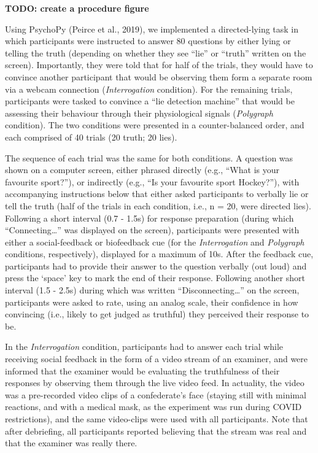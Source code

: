 \documentclass[
  man,floatsintext]{apa6}
\begin{document}
\textbf{TODO: create a procedure figure}

Using PsychoPy (Peirce et al., 2019), we implemented a directed-lying task in which participants were instructed to answer 80 questions by either lying or telling the truth (depending on whether they see ``lie'' or ``truth'' written on the screen). Importantly, they were told that for half of the trials, they would have to convince another participant that would be observing them form a separate room via a webcam connection (\emph{Interrogation} condition). For the remaining trials, participants were tasked to convince a ``lie detection machine'' that would be assessing their behaviour through their physiological signals (\emph{Polygraph} condition). The two conditions were presented in a counter-balanced order, and each comprised of 40 trials (20 truth; 20 lies).

The sequence of each trial was the same for both conditions. A question was shown on a computer screen, either phrased directly (e.g., ``What is your favourite sport?''), or indirectly (e.g., ``Is your favourite sport Hockey?''), with accompanying instructions below that either asked participants to verbally lie or tell the truth (half of the trials in each condition, i.e., n = 20, were directed lies). Following a short interval (0.7 - 1.5s) for response preparation (during which ``Connecting\ldots{}'' was displayed on the screen), participants were presented with either a social-feedback or biofeedback cue (for the \emph{Interrogation} and \emph{Polygraph} conditions, respectively), displayed for a maximum of 10s. After the feedback cue, participants had to provide their answer to the question verbally (out loud) and press the `space' key to mark the end of their response. Following another short interval (1.5 - 2.5s) during which was written ``Disconnecting\ldots{}'' on the screen, participants were asked to rate, using an analog scale, their confidence in how convincing (i.e., likely to get judged as truthful) they perceived their response to be.

In the \emph{Interrogation} condition, participants had to answer each trial while receiving social feedback in the form of a video stream of an examiner, and were informed that the examiner would be evaluating the truthfulness of their responses by observing them through the live video feed. In actuality, the video was a pre-recorded video clips of a confederate's face (staying still with minimal reactions, and with a medical mask, as the experiment was run during COVID restrictions), and the same video-clips were used with all participants. Note that after debriefing, all participants reported believing that the stream was real and that the examiner was really there.
\end{document}
